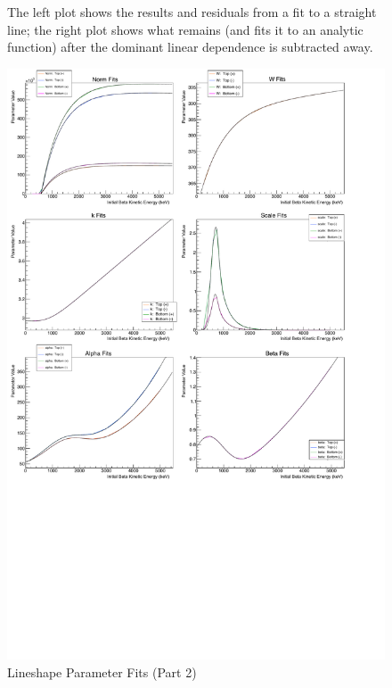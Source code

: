 \begin{figure}[h!!tb]
{%
	The left plot shows the results and residuals from a fit to a straight line; the right plot shows what remains (and fits it to an analytic function) after the dominant linear dependence is subtracted away.}	
	\label{fig:lineshapeparams_part1}
\end{figure}
\begin{figure}[h!!tb]
	\centering
	\includegraphics[width=.999\linewidth]
	{Figures/LineshapeParams_Set2.pdf}
	\caption[Lineshape Parameter Fits (Part 2)]{Lineshape Parameter Fits (Part 2)}
	\label{fig:lineshapeparams_scale}
	\label{fig:lineshapeparams_part2}
\end{figure}
